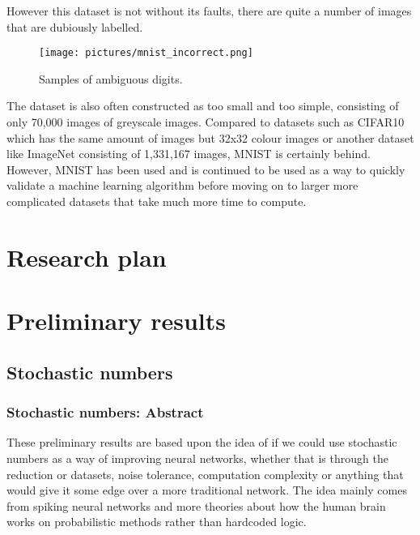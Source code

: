 \documentclass[a4paper,oneside,phd,etd]{BYUPhys}
\begin{document}
However this dataset is not without its faults, there are quite a number of images that are dubiously labelled.
\begin{figure}[H]
\centering
\texttt{[image: pictures/mnist\_incorrect.png]}
\caption{Samples of ambiguous digits\cite{fig:mnist_incorrect}.}
\label{fig:incorrect_mnist}
\end{figure}
The dataset is also often constructed as too small and too simple, consisting of only 70,000 images of greyscale images. Compared to datasets such as CIFAR10 which has the same amount of images but 32x32 colour images or another dataset like ImageNet consisting of 1,331,167 images, MNIST is certainly behind. However, MNIST has been used and is continued to be used as a way to quickly validate a machine learning algorithm before moving on to larger more complicated datasets that take much more time to compute.

\chapter{Research plan}

\chapter{Preliminary results}

\section{Stochastic numbers}
\subsection{Stochastic numbers: Abstract}
These preliminary results are based upon the idea of if we could use stochastic numbers as a way of improving neural networks, whether that is through the reduction or datasets, noise tolerance, computation complexity or anything that would give it some edge over a more traditional network.
The idea mainly comes from spiking neural networks and more theories about how the human brain works on probabilistic methods rather than hardcoded logic.
\end{document}
